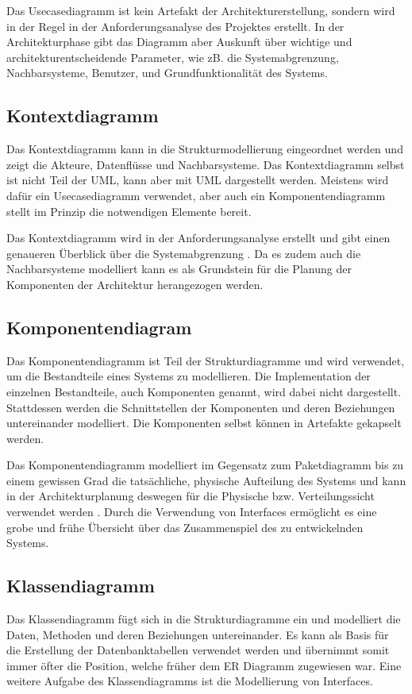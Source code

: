 Das Usecasediagramm ist kein Artefakt der Architekturerstellung, sondern wird in der Regel in der Anforderungsanalyse des Projektes erstellt. In der Architekturphase gibt das Diagramm aber Auskunft über wichtige und architekturentscheidende Parameter, wie zB. die Systemabgrenzung, Nachbarsysteme, Benutzer, und Grundfunktionalität des Systems. \cite[S. 148]{basiswissen}

\subsection{Kontextdiagramm}
Das Kontextdiagramm kann in die Strukturmodellierung eingeordnet werden und zeigt die Akteure, Datenflüsse und Nachbarsysteme. Das Kontextdiagramm selbst ist nicht Teil der UML, kann aber mit UML dargestellt werden. Meistens wird dafür ein Usecasediagramm verwendet, aber auch ein Komponentendiagramm stellt im Prinzip die notwendigen Elemente bereit. \cite[S. 255]{glasklar}

Das Kontextdiagramm wird in der Anforderungsanalyse erstellt und gibt einen genaueren Überblick über die Systemabgrenzung \cite[S. 255]{glasklar}. Da es zudem auch die Nachbarsysteme modelliert kann es als Grundstein für die Planung der Komponenten der Architektur herangezogen werden.


\subsection{Komponentendiagram}
Das Komponentendiagramm ist Teil der Strukturdiagramme und wird verwendet, um die Bestandteile eines Systems zu modellieren. Die Implementation der einzelnen Bestandteile, auch Komponenten genannt, wird dabei nicht dargestellt. Stattdessen werden die Schnittstellen der Komponenten und deren Beziehungen untereinander modelliert. Die Komponenten selbst können in Artefakte gekapselt werden. \cite[S. 216]{glasklar}

Das Komponentendiagramm modelliert im Gegensatz zum Paketdiagramm bis zu einem gewissen Grad die tatsächliche, physische Aufteilung des Systems und kann in der Architekturplanung deswegen für die Physische bzw. Verteilungssicht verwendet werden \cite[S. 223]{glasklar}\cite[S. 139]{basiswissen}. Durch die Verwendung von Interfaces ermöglicht es eine grobe und frühe Übersicht über das Zusammenspiel des zu entwickelnden Systems.

\subsection{Klassendiagramm}
Das Klassendiagramm fügt sich in die Strukturdiagramme ein und modelliert die Daten, Methoden und deren Beziehungen untereinander. Es kann als Basis für die Erstellung der Datenbanktabellen verwendet werden und übernimmt somit immer öfter die Position, welche früher dem ER Diagramm zugewiesen war. Eine weitere Aufgabe des Klassendiagramms ist die Modellierung von Interfaces. \cite[S. 108-110]{glasklar}

